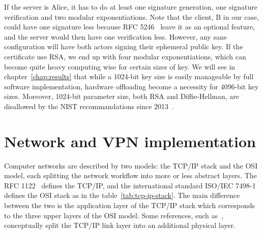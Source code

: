 If the server is Alice, it has to do at least one signature generation, one signature verification and two modular exponentiations.
Note that the client, B in our case, could have one signature less because RFC 5246~\cite{rfc5246} leave it as an optional feature, and the server would then have one verification less.
However, any sane configuration will have both actors signing their ephemeral public key.
If the certificate use RSA, we end up with four modular exponentiations, which can become quite heavy computing wise for certain sizes of key.
We will see in chapter~\ref{chap:results} that while a 1024-bit key size is easily manageable by full software implementation, hardware offloading become a necessity for 4096-bit key sizes.
Moreover, 1024-bit parameter size, both RSA and Diffie-Hellman, are disallowed by the NIST recommandations since 2013~\cite{nist-sp800-131A}.












\section{Network and VPN implementation}\label{sec:theory-network}

Computer networks are described by two models: the TCP/IP stack and the OSI model, each splitting the network workflow into more or less abstract layers.
The RFC 1122~\cite{rfc1122} defines the TCP/IP, and the international standard ISO/IEC 7498-1~\cite{ISOIEC7498} defines the OSI stack as in the table~\ref{tab:tcp-ip-stack}.
The main difference between the two is the application layer of the TCP/IP stack which corresponds to the three upper layers of the OSI model.
Some references, such as~\citet{tanenbaum2011}, conceptually split the TCP/IP link layer into an additional physical layer.

